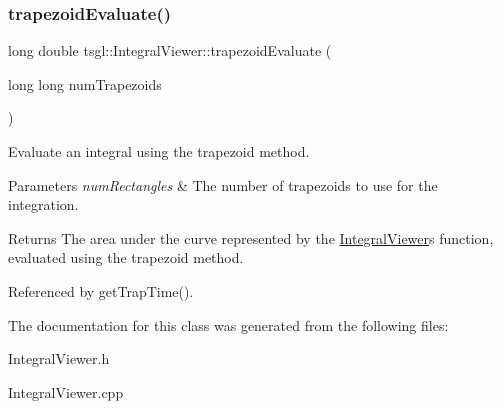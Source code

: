 \mbox{\label{classtsgl_1_1_integral_viewer_a485bd58c87267460baf013cdf786eae7}} 
\subsubsection{\texorpdfstring{trapezoid\+Evaluate()}{trapezoidEvaluate()}}
{\footnotesize\ttfamily long double tsgl\+::\+Integral\+Viewer\+::trapezoid\+Evaluate (\begin{DoxyParamCaption}\item[{long long}]{num\+Trapezoids }\end{DoxyParamCaption})}



Evaluate an integral using the trapezoid method. 


\begin{DoxyParams}{Parameters}
{\em num\+Rectangles} & The number of trapezoids to use for the integration. \\
\hline
\end{DoxyParams}
\begin{DoxyReturn}{Returns}
The area under the curve represented by the \hyperlink{classtsgl_1_1_integral_viewer}{Integral\+Viewer}\textquotesingle{}s function, evaluated using the trapezoid method. 
\end{DoxyReturn}


Referenced by get\+Trap\+Time().



The documentation for this class was generated from the following files\+:\begin{DoxyCompactItemize}
\item 
Integral\+Viewer.\+h\item 
Integral\+Viewer.\+cpp\end{DoxyCompactItemize}
